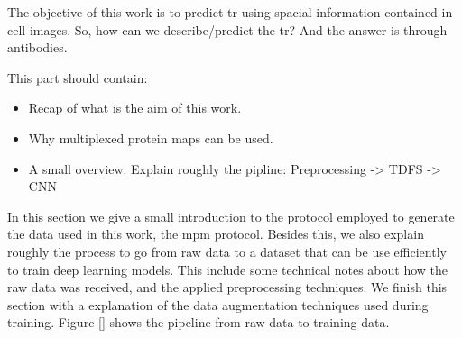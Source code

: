 
\glsresetall

The objective of this work is to predict \gls{tr} using spacial information contained in cell images. So, how can we describe/predict the \gls{tr}? And the answer is through antibodies.

This part should contain:
\begin{itemize}
  \item Recap of what is the aim of this work.
  \item Why multiplexed protein maps can be used.
  \item A small overview. Explain roughly the pipline: Preprocessing -> TDFS -> CNN
\end{itemize}

In this section we give a small introduction to the protocol employed to generate the data used in this work, the \gls{mpm} protocol. Besides this, we also explain roughly the process to go from raw data to a dataset that can be use efficiently to train deep learning models. This include some technical notes about how the raw data was received, and the applied preprocessing techniques. We finish this section with a explanation of the data augmentation techniques used during training. Figure \ref{} shows the pipeline from raw data to training data.

